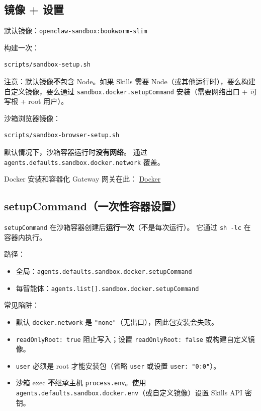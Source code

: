 \subsection{镜像 + 设置}


默认镜像：\texttt{openclaw-sandbox:bookworm-slim}

构建一次：

\begin{lstlisting}[language=bash]
scripts/sandbox-setup.sh
\end{lstlisting}


注意：默认镜像\textbf{不}包含 Node。如果 Skills 需要 Node（或其他运行时），要么构建自定义镜像，要么通过 \texttt{sandbox.docker.setupCommand} 安装（需要网络出口 + 可写根 + root 用户）。

沙箱浏览器镜像：

\begin{lstlisting}[language=bash]
scripts/sandbox-browser-setup.sh
\end{lstlisting}


默认情况下，沙箱容器运行时\textbf{没有网络}。
通过 \texttt{agents.defaults.sandbox.docker.network} 覆盖。

Docker 安装和容器化 Gateway 网关在此：
\href{/install/docker}{Docker}

\subsection{setupCommand（一次性容器设置）}


\texttt{setupCommand} 在沙箱容器创建后\textbf{运行一次}（不是每次运行）。
它通过 \texttt{sh -lc} 在容器内执行。

路径：

\begin{itemize}
  \item 全局：\texttt{agents.defaults.sandbox.docker.setupCommand}
  \item 每智能体：\texttt{agents.list[].sandbox.docker.setupCommand}
\end{itemize}


常见陷阱：

\begin{itemize}
  \item 默认 \texttt{docker.network} 是 \texttt{"none"}（无出口），因此包安装会失败。
  \item \texttt{readOnlyRoot: true} 阻止写入；设置 \texttt{readOnlyRoot: false} 或构建自定义镜像。
  \item \texttt{user} 必须是 root 才能安装包（省略 \texttt{user} 或设置 \texttt{user: "0:0"}）。
  \item 沙箱 exec \textbf{不}继承主机 \texttt{process.env}。使用 \texttt{agents.defaults.sandbox.docker.env}（或自定义镜像）设置 Skills API 密钥。
\end{itemize}


